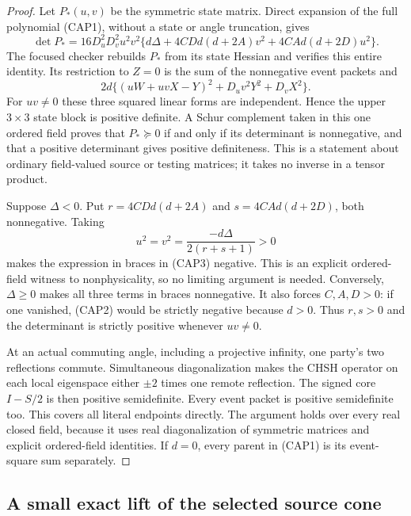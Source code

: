 \begin{proof}
Let $P_*(u,v)$ be the symmetric state matrix.  Direct expansion of the
full polynomial (CAP1), without a state or angle truncation, gives
\[
\det P_*=16D_u^2D_v^2u^2v^2
 \{d\Delta+4CDd(d+2A)v^2+4CAd(d+2D)u^2\}.
\tag{CAP3}
\]
The focused checker rebuilds $P_*$ from its state Hessian and verifies
this entire identity.  Its restriction to $Z=0$ is the sum of the
nonnegative event packets and
\[
2d\{(uW+uvX-Y)^2+D_uv^2Y^2+D_vX^2\}.
\tag{CAP4}
\]
For $uv\ne0$ these three squared linear forms are independent.  Hence
the upper $3\times3$ state block is positive definite.  A Schur
complement taken in this one ordered field proves that $P_*\succeq0$
if and only if its determinant is nonnegative, and that a positive
determinant gives positive definiteness.  This is a statement about
ordinary field-valued source or testing matrices; it takes no inverse
in a tensor product.

Suppose $\Delta<0$.  Put $r=4CDd(d+2A)$ and
$s=4CAd(d+2D)$, both nonnegative.  Taking
\[
u^2=v^2=\frac{-d\Delta}{2(r+s+1)}>0
\]
makes the expression in braces in (CAP3) negative.  This is an explicit
ordered-field witness to nonphysicality, so no limiting argument is
needed.  Conversely, $\Delta\geq0$ makes all three terms in braces
nonnegative.  It also forces $C,A,D>0$: if one vanished, (CAP2) would
be strictly negative because $d>0$.  Thus $r,s>0$ and the determinant
is strictly positive whenever $uv\ne0$.

At an actual commuting angle, including a projective infinity, one
party's two reflections commute.  Simultaneous diagonalization makes
the CHSH operator on each local eigenspace either $\pm2$ times one
remote reflection.  The signed core $I-S/2$ is then positive
semidefinite.  Every event packet is positive semidefinite too.  This
covers all literal endpoints directly.  The argument holds over every
real closed field, because it uses real diagonalization of symmetric
matrices and explicit ordered-field identities.  If $d=0$, every
parent in (CAP1) is its event-square sum separately.
\end{proof}

\subsection{A small exact lift of the selected source cone}

